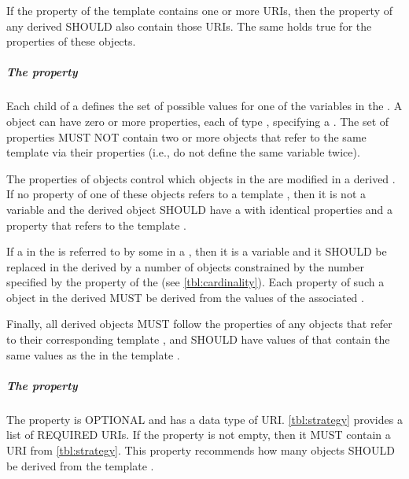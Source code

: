 If the  property of the template  contains one or more URIs, then the  property of any derived  SHOULD also contain those URIs. 
The same holds true for the  properties of these  objects.

\subparagraph{The  property}\label{sec:hasVariableFeature}

Each  child of a  defines the set of possible values for one of the variables in the .
A  object can have zero or more  properties, each of type , specifying a . 
The set of   properties MUST NOT contain two or more  objects that refer to the same template  via their  properties (i.e., do not define the same variable twice).

The  properties of  objects control which  objects in the  are modified in a derived .
If no  property of one of these  objects refers to a template , then it is not a variable and the derived object SHOULD have a  with identical properties
and a  property that refers to the template .

If a  in the  is referred to by some  in a , then it is a variable and it SHOULD be replaced in the derived  by a number of  objects constrained by the number specified by the  property of the  (see \ref{tbl:cardinality}).
Each property of such a  object in the derived  MUST be derived from the values of the  associated .


Finally, all derived  objects MUST follow the  properties of any 
 objects that refer to their corresponding template , and SHOULD have values of  that contain the same values as the  in the template .


\subparagraph{The  property}\label{sec:strategy}
The  property is OPTIONAL and has a data type of URI. \ref{tbl:strategy} provides a list of REQUIRED  URIs. If the  property is not empty, then it MUST contain a URI from \ref{tbl:strategy}. This property recommends how many  objects SHOULD be derived from the template .

